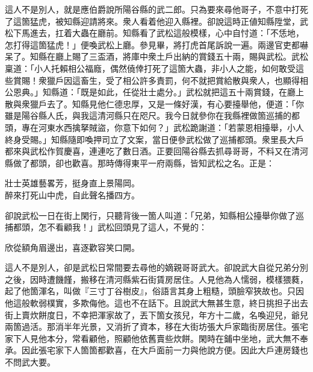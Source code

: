 這人不是別人，就是應伯爵說所陽谷縣的武二郎。只為要來尋他哥子，不意中打死了這箇猛虎，被知縣迎請將來。衆人看着他迎入縣裡。卻說這時正値知縣陞堂，武松下馬進去，扛着大蟲在廳前。知縣看了武松這般模樣，心中自忖道：「不恁地，怎打得這箇猛虎！」便喚武松上廳。參見畢，將打虎首尾訴說一遍。兩邊官吏都嚇呆了。知縣在廳上賜了三盃酒，將庫中衆土戶出納的賞錢五十兩，賜與武松。武松稟道：「小人托賴相公福廕，偶然僥倖打死了這箇大蟲，非小人之能，如何敢受這些賞賜！衆獵戶因這畜生，受了相公許多責罰，何不就把賞給散與衆人，也顯得相公恩典。」{}知縣道：「既是如此，任從壯士處分。」武松就把這五十兩賞錢，在廳上散與衆獵戶去了。知縣見他仁德忠厚，又是一條好漢，有心要擡舉他，便道：「你雖是陽谷縣人氏，與我這清河縣只在咫尺。我今日就參你在我縣裡做箇巡捕的都頭，專在河東水西擒拏賊盜，你意下如何？」武松跪謝道：「若蒙恩相擡舉，小人終身受賜。」知縣隨即喚押司立了文案，當日便參武松做了巡捕都頭。衆里長大戶都來與武松作賀慶喜，連連吃了數日酒。正要回陽谷縣去抓尋哥哥，不料又在清河縣做了都頭，卻也歡喜。那時傳得東平一府兩縣，皆知武松之名。正是：

\begin{myquote}
壯士英雄藝畧芳，挺身直上景陽岡。\\
醉來打死山中虎，自此聲名播四方。
\end{myquote}

卻說武松一日在街上閑行，只聽背後一箇人叫道：「兄弟，知縣相公擡舉你做了巡捕都頭，怎不看顧我！」武松回頭見了這人，不覺的：

\begin{myquote}
欣從額角眉邊出，喜逐歡容笑口開。
\end{myquote}

這人不是別人，卻是武松日常間要去尋他的嫡親哥哥武大。卻說武大自從兄弟分別之後，因時遭饑饉，搬移在清河縣紫石街賃房居住。人見他為人懦弱，模樣猥蕤，起了他箇渾名，叫做『三寸丁谷樹皮』，{}俗語言其身上粗糙，頭臉窄狹故也。只因他這般軟弱樸實，多欺侮他。這也不在話下。且說武大無甚生意，終日挑担子出去街上賣炊餅度日，不幸把渾家故了，丟下箇女孩兒，年方十二歲，名喚迎兒，爺兒兩箇過活。那消半年光景，又消折了資本，移在大街坊張大戶家臨街房居住。張宅家下人見他本分，常看顧他，照顧他依舊賣些炊餅。閑時在鋪中坐地，武大無不奉承。因此張宅家下人箇箇都歡喜，在大戶面前一力與他說方便。因此大戶連房錢也不問武大要。

